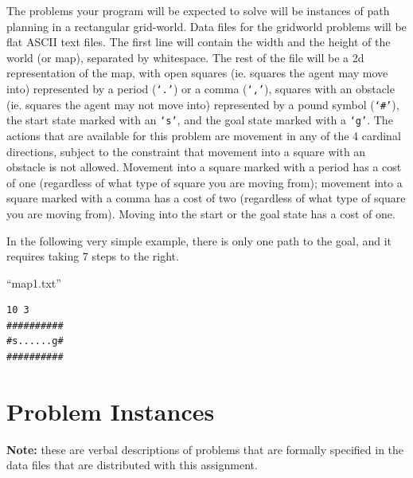 \documentclass[12pt]{article}
\newcommand{\ttt}[1]{\texttt{#1}}
\newcommand{\n}{\vspace{5mm}}
\begin{document}
The problems your program will be expected to solve will be instances of path
planning in a rectangular grid-world.  Data files for the gridworld problems
will be flat ASCII text files.  The first line will contain the width and the
height of the world (or map), separated by whitespace.  The rest of the file
will be a 2d representation of the map, with open squares (ie. squares the agent
may move into) represented by a period (\ttt{`.'}) or a comma (\ttt{`,'}),
squares with an obstacle (ie. squares the agent may not move into) represented
by a pound symbol (\ttt{`\#'}), the start state marked with an \ttt{`s'}, and
the goal state marked with a \ttt{`g'}.  The actions that are available for this
problem are movement in any of the 4 cardinal directions, subject to the
constraint that movement into a square with an obstacle is not allowed.
Movement into a square marked with a period has a cost of one (regardless of
what type of square you are moving from); movement into a square marked with a
comma has a cost of two (regardless of what type of square you are moving from).
Moving into the start or the goal state has a cost of one.

In the following very simple example, there is only one path to the goal, and it
requires taking 7 steps to the right.  

\begin{minipage}{3in}
\n
\noindent
``map1.txt''
\begin{verbatim}
10 3
##########
#s......g#
##########
\end{verbatim}
\end{minipage}


\section{Problem Instances}
\textbf{Note:} these are verbal descriptions of problems that are formally
specified in the data files that are distributed with this assignment.
\end{document}
